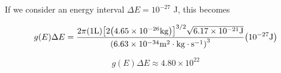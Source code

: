 \documentclass[12pt,a4paper]{article}
\begin{document}
If we consider an energy interval $\Delta E = 10^{-27}$ J, this becomes

\begin{equation}
	g(E)\Delta E = \frac{2\pi\qty(1\mathrm{ L})\qty[2\qty(4.65\times 10^{-26}\mathrm{ kg})]^{3/2}\sqrt{6.17\times 10^{-21}\mathrm{ J}}}{\qty(6.63\times 10^{-34}\mathrm{ m^2\cdot kg\cdot s^{-1}})^3}\qty(10^{-27}\mathrm{ J})
\end{equation}

\begin{equation}
	\boxed{
		g(E)\Delta E \approx 4.80\times 10^{22}
	} \label{eq:answer}
\end{equation}
\end{document}
